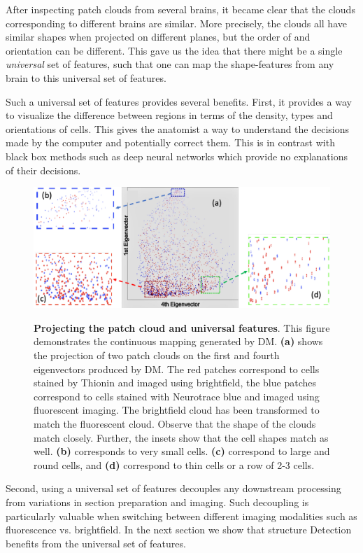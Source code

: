\documentclass[runningheads]{llncs}
\begin{document}
After inspecting patch clouds from several brains, it became clear
that the clouds corresponding to different brains are similar. More
precisely, the clouds all have similar shapes when projected on
different planes, but the order of and orientation can be
different. This gave us the idea that there might be a single {\em
  universal} set of features, such that one can map the shape-features from
any brain to this universal set of features.

Such a universal set of features provides several benefits. First, it
provides a way to visualize the difference between regions in terms of
the density, types and orientations of cells. This gives
the anatomist a way to understand the decisions made by the computer
and potentially correct them. This is in contrast with black box
methods such as deep neural networks which provide no explanations of
their decisions.

\begin{figure} [t]
  \includegraphics[width=\textwidth]{Images/Scatter.png}
\label{fig:diffusionmap}
\caption{{\bf Projecting the patch cloud and universal features}. This
  figure demonstrates the continuous mapping generated by DM. {\bf
    (a)} shows the projection of two patch clouds on the first and
  fourth eigenvectors produced by DM. The red patches correspond to
  cells stained by Thionin and imaged using brightfield, the blue
  patches correspond to cells stained with Neurotrace blue and imaged
  using fluorescent imaging. The brightfield cloud has been
  transformed to match the fluorescent cloud. Observe that the shape
  of the clouds match closely. Further, the insets show that the cell
  shapes match as well.  {\bf (b)} corresponds to very
  small cells. {\bf (c)} correspond to large and round cells, and {\bf
    (d)} correspond to thin cells or a row  of 2-3 cells.}
\end{figure}
Second, using a universal set of features decouples any downstream processing from
variations in section preparation and imaging. Such decoupling is particularly
valuable when switching between different imaging modalities such as
fluorescence vs. brightfield. In the next section we show that
structure Detection benefits from the universal set of features.
\end{document}
